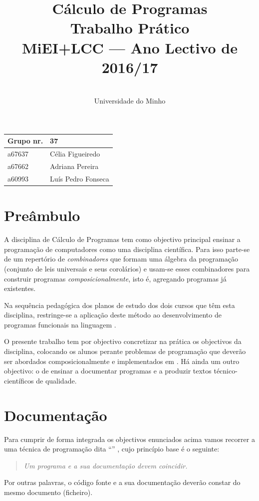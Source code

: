 \documentclass[a4paper]{article}
\title{
       	    Cálculo de Programas
\\
       	Trabalho Prático
\\
       	MiEI+LCC --- Ano Lectivo de 2016/17
}
\author{
       	\dium
\\
       	Universidade do Minho
}
\date\mydate
\begin{document}
\maketitle

\begin{center}\large
\begin{tabular}{ll}
\textbf{Grupo} nr. & 37
\\\hline
a67637 & Célia Figueiredo
\\
a67662 & Adriana Pereira
\\
a60993 & Luís Pedro Fonseca 
\end{tabular}
\end{center}

\tableofcontents

\newpage

\section{Preâmbulo}

A disciplina de Cálculo de Programas tem como objectivo principal ensinar
a progra\-mação de computadores como uma disciplina científica. Para isso
parte-se de um repertório de \emph{combinadores} que formam uma álgebra da
programação (conjunto de leis universais e seus corolários) e usam-se esses
combinadores para construir programas \emph{composicionalmente}, isto é,
agregando programas já existentes.
  
Na sequência pedagógica dos planos de estudo dos dois cursos que têm esta
disciplina, restringe-se a aplicação deste método ao desenvolvimento de programas
funcionais na linguagem \Haskell.

O presente trabalho tem por objectivo concretizar na prática os objectivos
da disciplina, colocando os alunos perante problemas de programação que
deverão ser abordados composicionalmente e implementados em \Haskell.
Há ainda um outro objectivo: o de ensinar a documentar programas e
a produzir textos técnico-científicos de qualidade.

\section{Documentação}
Para cumprir de forma integrada os objectivos enunciados acima vamos recorrer
a uma técnica de programa\-ção dita ``'' \cite{Kn92}, cujo
princípio base é o seguinte:
\begin{quote}\em
Um programa e a sua documentação devem coincidir.
\end{quote}
Por outras palavras, o código fonte e a sua documentação deverão constar
do mesmo documento (ficheiro).
\end{document}
